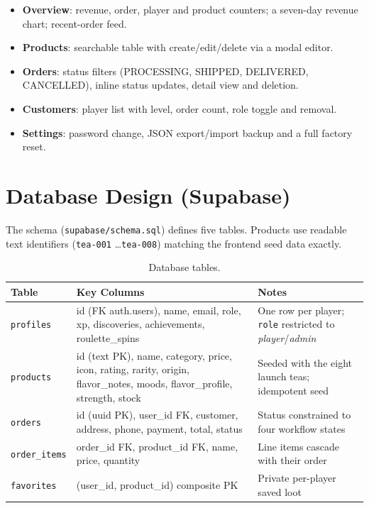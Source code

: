 \documentclass[11pt,a4paper]{article}
\begin{document}
\begin{itemize}[nosep]
    \item \textbf{Overview}: revenue, order, player and product counters;
          a seven-day revenue chart; recent-order feed.
    \item \textbf{Products}: searchable table with create/edit/delete via
          a modal editor.
    \item \textbf{Orders}: status filters (PROCESSING, SHIPPED, DELIVERED,
          CANCELLED), inline status updates, detail view and deletion.
    \item \textbf{Customers}: player list with level, order count, role
          toggle and removal.
    \item \textbf{Settings}: password change, JSON export/import backup and
          a full factory reset.
\end{itemize}


\section{Database Design (Supabase)}

The schema (\texttt{supabase/schema.sql}) defines five tables. Products use
readable text identifiers (\texttt{tea-001} \ldots \texttt{tea-008})
matching the frontend seed data exactly.

\begin{table}[h!]
\centering
\caption{Database tables.}
\begin{tabular}{@{}p{3.2cm}p{4.6cm}p{6.8cm}@{}}
\toprule
\textbf{Table} & \textbf{Key Columns} & \textbf{Notes} \\
\midrule
\texttt{profiles}     & id (FK auth.users), name, email, role, xp, discoveries, achievements, roulette\_spins & One row per player; \texttt{role} restricted to \emph{player}/\emph{admin} \\
\texttt{products}     & id (text PK), name, category, price, icon, rating, rarity, origin, flavor\_notes, moods, flavor\_profile, strength, stock & Seeded with the eight launch teas; idempotent seed \\
\texttt{orders}       & id (uuid PK), user\_id FK, customer, address, phone, payment, total, status & Status constrained to four workflow states \\
\texttt{order\_items} & order\_id FK, product\_id FK, name, price, quantity & Line items cascade with their order \\
\texttt{favorites}    & (user\_id, product\_id) composite PK & Private per-player saved loot \\
\bottomrule
\end{tabular}
\end{table}
\end{document}
